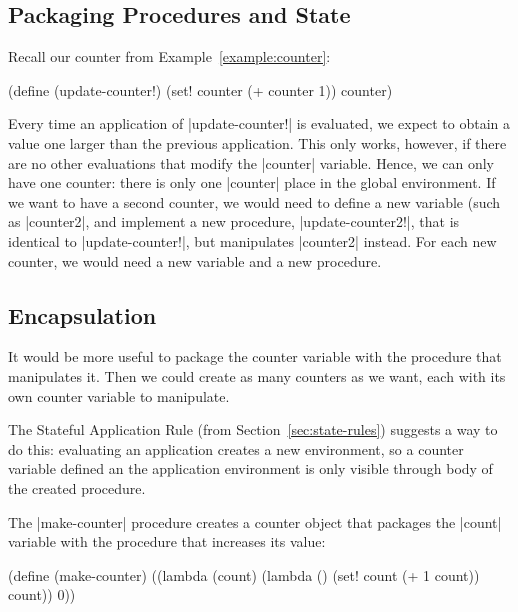 \begin{schemeregion}
\section{Packaging Procedures and State}

Recall our counter from Example~\ref{example:counter}:
\begin{schemedisplay}
(define (update-counter!) (set! counter (+ counter 1)) counter)
\end{schemedisplay}
Every time an application of \scheme|update-counter!| is evaluated, we expect to obtain a value one larger than the previous application.  This only works, however, if there are no other evaluations that modify the \scheme|counter| variable.  Hence, we can only have one counter: there is only one \scheme|counter| place in the global environment.  If we want to have a second counter, we would need to define a new variable (such as \scheme|counter2|, and implement a new procedure, \scheme|update-counter2!|, that is identical to \scheme|update-counter!|, but manipulates \scheme|counter2| instead.  For each new counter, we would need a new variable and a new procedure.

\subsection{Encapsulation}\label{sec:encapsulation}

It would be more useful to package the counter variable with the procedure that manipulates it.  Then we could create as many counters as we want, each with its own counter variable to manipulate.  

The Stateful Application Rule (from Section~\ref{sec:state-rules}) suggests a way to do this: evaluating an application creates a new environment, so a counter variable defined an the application environment is only visible through body of the created procedure.  

The \scheme|make-counter| procedure creates a counter object that packages the \scheme|count| variable with the procedure that increases its value:
\begin{schemedisplay}
(define (make-counter)
  ((lambda (count) 
     (lambda () (set! count (+ 1 count)) count))
   0))
\end{schemedisplay}


\end{schemeregion}
